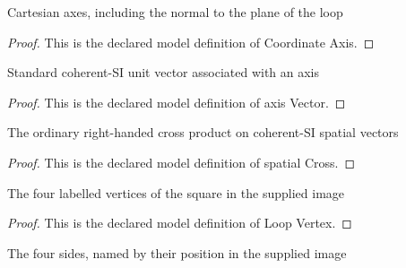 \begin{definition}
  \label{def:physics:phyx-mini-0952:phyxminiproblems-problemphyxmini0952-coordinateaxis}
  Cartesian axes, including the normal to the plane of the loop
\end{definition}
\begin{proof}
  This is the declared model definition of Coordinate Axis.
\end{proof}
\begin{definition}
  \label{def:physics:phyx-mini-0952:phyxminiproblems-problemphyxmini0952-axisvector}
  Standard coherent-SI unit vector associated with an axis
\end{definition}
\begin{proof}
  This is the declared model definition of axis Vector.
\end{proof}
\begin{definition}
  \label{def:physics:phyx-mini-0952:phyxminiproblems-problemphyxmini0952-spatialcross}
  The ordinary right-handed cross product on coherent-SI spatial vectors
\end{definition}
\begin{proof}
  This is the declared model definition of spatial Cross.
\end{proof}
\begin{definition}
  \label{def:physics:phyx-mini-0952:phyxminiproblems-problemphyxmini0952-loopvertex}
  The four labelled vertices of the square in the supplied image
\end{definition}
\begin{proof}
  This is the declared model definition of Loop Vertex.
\end{proof}
\begin{definition}
  \label{def:physics:phyx-mini-0952:phyxminiproblems-problemphyxmini0952-loopside}
  The four sides, named by their position in the supplied image
\end{definition}

